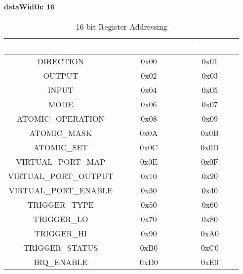 \paragraph{dataWidth: 16}
\begin{table}[h]
  \centering
  \begin{tabular}{|c|c|c|}
      \hline
      \rowcolor{dark-gray}  %
      \textcolor{white}{\textbf{Register Name}} & \textcolor{white}{\textbf{Address Start}} & \textcolor{white}{\textbf{Address End}} \\ \hline
      DIRECTION & 0x00 & 0x01 \\ \hline
      OUTPUT & 0x02 & 0x03\\ \hline
      INPUT & 0x04 & 0x05 \\ \hline
      MODE & 0x06 & 0x07 \\ \hline
      ATOMIC\_OPERATION & 0x08 & 0x09 \\ \hline
      ATOMIC\_MASK & 0x0A & 0x0B\\ \hline
      ATOMIC\_SET & 0x0C & 0x0D \\ \hline
      VIRTUAL\_PORT\_MAP & 0x0E & 0x0F \\ \hline
      VIRTUAL\_PORT\_OUTPUT & 0x10 & 0x20 \\ \hline
      VIRTUAL\_PORT\_ENABLE & 0x30 & 0x40 \\ \hline
      TRIGGER\_TYPE & 0x50 & 0x60 \\ \hline
      TRIGGER\_LO & 0x70 & 0x80 \\ \hline
      TRIGGER\_HI & 0x90 & 0xA0 \\ \hline
      TRIGGER\_STATUS & 0xB0 & 0xC0 \\ \hline
      IRQ\_ENABLE & 0xD0 & 0xE0 \\ \hline
  \end{tabular}
  \caption{16-bit Register Addressing}
\end{table}


\newpage

